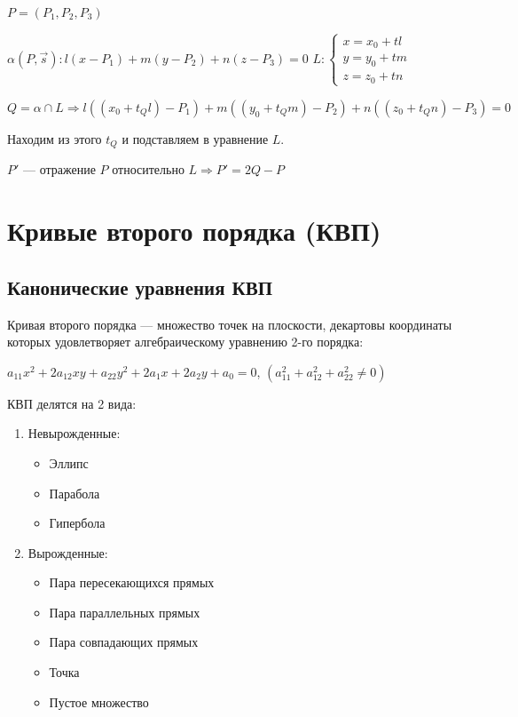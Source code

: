 \(P = (P_1, P_2, P_3)\)

\(\alpha(P, \vec s): l(x - P_1) + m(y - P_2) + n(z - P_3) = 0\)
\(L:
\begin{cases}
    x = x_0 + t l \\
    y = y_0 + t m \\
    z = z_0 + t n
\end{cases}\)

\(Q = \alpha \cap L \Rightarrow l((x_0 + t_Q l) - P_1) + m((y_0 + t_Q m) - P_2) + n((z_0 + t_Q n) - P_3) = 0\)

Находим из этого \(t_Q\) и подставляем в уравнение \(L\).

\(P'\) --- отражение \(P\) относительно \(L \Rightarrow P' = 2Q - P\)

\newpage
\section{Кривые второго порядка (КВП)}
\subsection{Канонические уравнения КВП}
Кривая второго порядка --- множество точек на плоскости, декартовы координаты которых удовлетворяет алгебраическому уравнению 2-го порядка:

\(a_{11} x^2 + 2 a_{12} xy + a_{22} y^2 + 2 a_1 x + 2 a_2 y + a_0 = 0\), \((a_{11}^2 + a_{12}^2 + a_{22}^2 \neq 0)\)

КВП делятся на 2 вида:
\begin{enumerate}
    \item Невырожденные:
          \begin{itemize}
              \item Эллипс
              \item Парабола
              \item Гипербола
          \end{itemize}
    \item Вырожденные:
          \begin{itemize}
              \item Пара пересекающихся прямых
              \item Пара параллельных прямых
              \item Пара совпадающих прямых
              \item Точка
              \item Пустое множество
          \end{itemize}
\end{enumerate}

